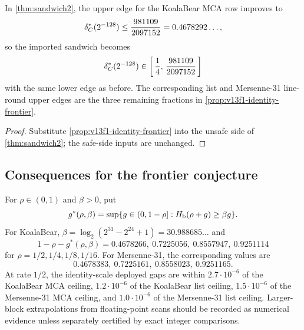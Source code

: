 \begin{corollary}\label{cor:v13f1-sandwich-edges}
In \cref{thm:sandwich2}, the upper edge for the KoalaBear MCA row improves to
\[
        \delta^*_C(2^{-128})\le {981109\over2097152}=0.4678292\ldots,
\]
so the imported sandwich becomes
\[
        \delta^*_C(2^{-128})\in\left[\,{1\over4},\,{981109\over2097152}\,\right]
\]
with the same lower edge as before.  The corresponding list and Mersenne-31 line-round upper edges are the three remaining fractions in \cref{prop:v13f1-identity-frontier}.
\end{corollary}

\begin{proof}
Substitute \cref{prop:v13f1-identity-frontier} into the unsafe side of \cref{thm:sandwich2}; the safe-side inputs are unchanged.
\end{proof}

\subsection{Consequences for the frontier conjecture}

\begin{definition}\label{def:v13f1-gstar}
For $\rho\in(0,1)$ and $\beta>0$, put
\[
        g^*(\rho,\beta)=\sup\{g\in(0,1-\rho]:H_{\mathrm b}(\rho+g)\ge \beta g\}.
\]
For KoalaBear, $\beta=\log_2(2^{31}-2^{24}+1)=30.988685\ldots$ and
\[
1-\rho-g^*(\rho,\beta)=0.4678266,\ 0.7225056,\ 0.8557947,\ 0.9251114
\]
for $\rho=1/2,1/4,1/8,1/16$.  For Mersenne-31, the corresponding values are
\[
0.4678383,\ 0.7225161,\ 0.8558023,\ 0.9251165.
\]
At rate $1/2$, the identity-scale deployed gaps are within $2.7\cdot10^{-6}$ of the KoalaBear MCA ceiling, $1.2\cdot10^{-6}$ of the KoalaBear list ceiling, $1.5\cdot10^{-6}$ of the Mersenne-31 MCA ceiling, and $1.0\cdot10^{-6}$ of the Mersenne-31 list ceiling.  Larger-block extrapolations from floating-point scans should be recorded as numerical evidence unless separately certified by exact integer comparisons.
\end{definition}

